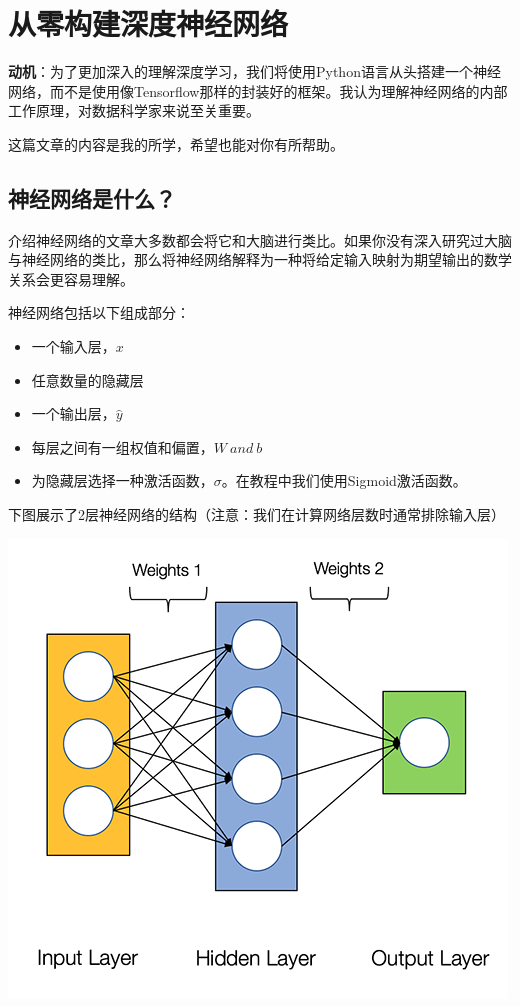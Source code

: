 
\chapter{从零构建深度神经网络}

\textbf{动机}：为了更加深入的理解深度学习，我们将使用Python语言从头搭建一个神经网络，而不是使用像Tensorflow那样的封装好的框架。我认为理解神经网络的内部工作原理，对数据科学家来说至关重要。

这篇文章的内容是我的所学，希望也能对你有所帮助。

\section{神经网络是什么？}

介绍神经网络的文章大多数都会将它和大脑进行类比。如果你没有深入研究过大脑与神经网络的类比，那么将神经网络解释为一种将给定输入映射为期望输出的数学关系会更容易理解。

神经网络包括以下组成部分：

\begin{itemize}
    \item 一个输入层，$x$
    \item 任意数量的隐藏层
    \item 一个输出层，$\hat{y}$
    \item 每层之间有一组权值和偏置，$W \ and \ b$
    \item 为隐藏层选择一种激活函数，$\sigma$。在教程中我们使用Sigmoid激活函数。
\end{itemize}

下图展示了2层神经网络的结构（注意：我们在计算网络层数时通常排除输入层）

\noindent\includegraphics[width=\textwidth]{1.png}

